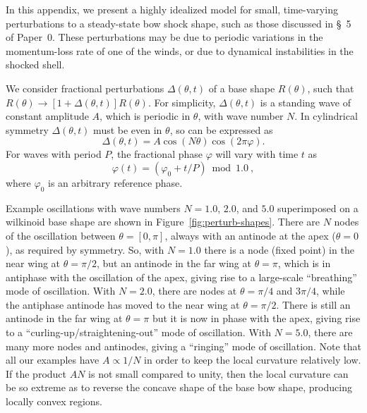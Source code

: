 In this appendix, we present a highly idealized model for small,
time-varying perturbations to a steady-state bow shock shape, such as
those discussed in \S~5 of Paper~0.  These perturbations may be due to
periodic variations in the momentum-loss rate of one of the winds, or
due to dynamical instabilities in the shocked shell.

We consider fractional perturbations \(\Delta(\theta, t)\) of a base shape
\(R(\theta)\), such that
\(R(\theta) \to [1 + \Delta(\theta, t)] R(\theta)\).  For simplicity,
\(\Delta(\theta, t)\) is a standing wave of constant amplitude \(A\), which is
periodic in \(\theta\), with wave number \(N\).  In cylindrical symmetry
\(\Delta(\theta, t)\) must be even in \(\theta\), so can be expressed as
\begin{equation}
  \label{eq:standing-wave}
  \Delta(\theta, t) = A \cos(N \theta) \cos(2\pi \varphi) . 
\end{equation}
For waves with period \(P\), the fractional phase \(\varphi\) will
vary with time \(t\) as
\begin{equation}
  \label{eq:fractional-phase}
  \varphi(t) = (\varphi_0 + t/P) \bmod 1.0\ ,
\end{equation}
where \(\varphi_0\) is an arbitrary reference phase.

Example oscillations with wave numbers \(N = 1.0\), \(2.0\), and
\(5.0\) superimposed on a wilkinoid base shape are shown in
Figure~\ref{fig:perturb-shapes}.  There are \(N\) nodes of the
oscillation between \(\theta = [0, \pi]\), always with an antinode at the apex
(\(\theta = 0\)), as required by symmetry.  So, with \(N = 1.0\) there is a
node (fixed point) in the near wing at \(\theta = \pi/2\), but an antinode in
the far wing at \(\theta = \pi\), which is in antiphase with the oscillation
of the apex, giving rise to a large-scale ``breathing'' mode of
oscillation.  With \(N = 2.0\), there are nodes at \(\theta = \pi/4\) and
\(3\pi/4\), while the antiphase antinode has moved to the near wing at
\(\theta = \pi/2\).  There is still an antinode in the far wing at
\(\theta = \pi\) but it is now in phase with the apex, giving rise to a
``curling-up/straightening-out'' mode of oscillation.  With
\(N = 5.0\), there are many more nodes and antinodes, giving a
``ringing'' mode of oscillation.  Note that all our examples have
\(A \propto 1/N\) in order to keep the local curvature relatively low.  If
the product \(A N\) is not small compared to unity, then the local
curvature can be so extreme as to reverse the concave shape of the
base bow shape, producing locally convex regions.

